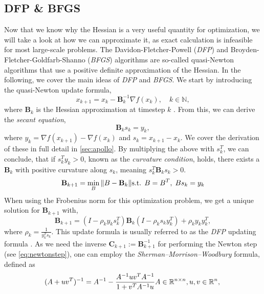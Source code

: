 \subsection{DFP \& BFGS}
\label{sec:bfgs}
Now that we know why the Hessian is a very useful quantity for optimization, we will take a look at how we can approximate it,
as exact calculation is infeasible for most large-scale problems.
The Davidon-Fletcher-Powell (\emph{DFP}\cite{Goodfellow-et-al-2016})  and Broyden-Fletcher-Goldfarb-Shanno (\emph{BFGS}\cite{BFGS})
algorithms are so-called quasi-Newton algorithms 
that use a positive definite approximation of the Hessian. In the following,
we cover the main ideas of \emph{DFP} and \emph{BFGS}. We start by introducing the quasi-Newton update formula,
\begin{equation}
x_{k+1} = x_k - \mathbf{B}_k^{-1} \nabla f(x_k), \quad k \in \mathbb{N},
\end{equation}
where $\mathbf{B}_k$ is the Hessian approximation at timestep $k$ \cite{nocedal2006numerical}.
From this, we can derive the \emph{secant equation},
\begin{equation}
\mathbf{B}_k s_k = y_k,
\end{equation}
where $y_k = \nabla f(x_{k+1}) - \nabla f(x_k)$ and $s_k = x_{k+1} - x_k$.
We cover the derivation of these in full detail in \ref{sec:apollo}.
By multiplying the above with $s_k^T$, we can conclude, that if $s_k^T y_k > 0$,
known as the \emph{curvature condition}, holds, there exists a $\mathbf{B}_k$ with positive curvature along $s_k$,
meaning $s_k^T\mathbf{B}_k s_k > 0$.
\begin{equation}
    \mathbf{B}_{k+1} = \min_{B} \|B - \mathbf{B}_k\| \\
    \text{s.t. }   B = B^T, \; Bs_k = y_k 
   \end{equation}
When using the Frobenius norm for this optimization problem, we get a unique solution for $\mathbf{B}_{k+1}$ with,
\begin{equation} \label{eq:DFP}
\mathbf{B}_{k+1} = \left(I - \rho_k y_k s_k^T\right) \mathbf{B}_k \left(I - \rho_k s_k y_k^T\right) + \rho_k y_k y_k^T,
\end{equation}
where $\rho_k = \frac{1}{y_k^T s_k}$. This update formula is usually referred to as the \emph{DFP} updating formula \cite{DFP}.
As we need the inverse $\mathbf{C}_{k+1} := \mathbf{B}_{k+1}^{-1}$ for performing the Newton step (see \ref{eq:newtonstep}), one can employ the \emph{Sherman--Morrison--Woodbury} formula, defined as
\begin{equation}
    (A + uv^T)^{-1} = A^{-1} - \frac{A^{-1}uv^T A^{-1}}{1 + v^T A^{-1}u} \\ A \in \mathbb{R}^{n \times n},\\
    u, v \in \mathbb{R}^n,\\
\end{equation}
